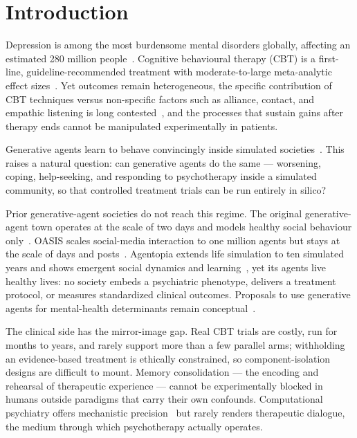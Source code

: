 \documentclass[10pt]{article}
\begin{document}
\section{Introduction}\label{sec:intro}

Depression is among the most burdensome mental disorders globally, affecting an estimated 280 million people~\citep{who2022}.
Cognitive behavioural therapy (CBT) is a first-line, guideline-recommended treatment with moderate-to-large meta-analytic effect sizes~\citep{cuijpers2013,hofmann2012,cuijpers2023}.
Yet outcomes remain heterogeneous, the specific contribution of CBT techniques versus non-specific factors such as alliance, contact, and empathic listening is long contested~\citep{lambert1992}, and the processes that sustain gains after therapy ends cannot be manipulated experimentally in patients.

Generative agents learn to behave convincingly inside simulated societies~\citep{park2023}.
This raises a natural question: can generative agents do the same --- worsening, coping, help-seeking, and responding to psychotherapy inside a simulated community, so that controlled treatment trials can be run entirely in silico?

Prior generative-agent societies do not reach this regime.
The original generative-agent town operates at the scale of two days and models healthy social behaviour only~\citep{park2023}.
OASIS scales social-media interaction to one million agents but stays at the scale of days and posts~\citep{oasis2024}.
Agentopia extends life simulation to ten simulated years and shows emergent social dynamics and learning~\citep{agentopia2026}, yet its agents live healthy lives: no society embeds a psychiatric phenotype, delivers a treatment protocol, or measures standardized clinical outcomes.
Proposals to use generative agents for mental-health determinants remain conceptual~\citep{kambeitz2025}.

The clinical side has the mirror-image gap.
Real CBT trials are costly, run for months to years, and rarely support more than a few parallel arms; withholding an evidence-based treatment is ethically constrained, so component-isolation designs are difficult to mount.
Memory consolidation --- the encoding and rehearsal of therapeutic experience --- cannot be experimentally blocked in humans outside paradigms that carry their own confounds.
Computational psychiatry offers mechanistic precision~\citep{montague2012,hauser2022,friston2023,zavlis2025} but rarely renders therapeutic dialogue, the medium through which psychotherapy actually operates.
\end{document}
